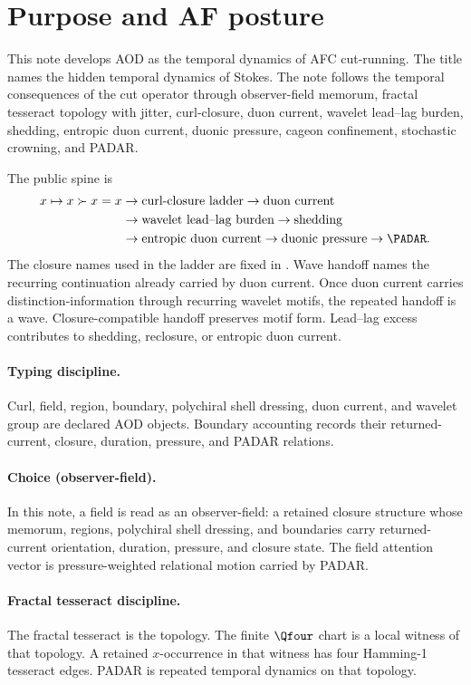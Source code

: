 
\section{Purpose and AF posture}\label{sec:purpose-af-posture}

This note develops AOD as the temporal dynamics of AFC cut-running. The title names the hidden temporal dynamics of Stokes. The note follows the temporal consequences of the cut operator through observer-field memorum, fractal tesseract topology with jitter, curl-closure, duon current, wavelet lead--lag burden, shedding, entropic duon current, duonic pressure, cageon confinement, stochastic crowning, and PADAR.

The public spine is
\[
\begin{aligned}
 x\mapsto x\succ x=x
&\to \text{curl-closure ladder}
\to \text{duon current} \\
&\to \text{wavelet lead--lag burden}
\to \text{shedding} \\
&\to \text{entropic duon current}
\to \text{duonic pressure}
\to \PADAR.
\end{aligned}
\]
The closure names used in the ladder are fixed in . Wave handoff names the recurring continuation already carried by duon current. Once duon current carries distinction-information through recurring wavelet motifs, the repeated handoff is a wave. Closure-compatible handoff preserves motif form. Lead--lag excess contributes to shedding, reclosure, or entropic duon current.

\paragraph{Typing discipline.}
Curl, field, region, boundary, polychiral shell dressing, duon current, and wavelet group are declared AOD objects. Boundary accounting records their returned-current, closure, duration, pressure, and PADAR relations.

\paragraph{Choice (observer-field).}
In this note, a field is read as an observer-field: a retained closure structure whose memorum, regions, polychiral shell dressing, and boundaries carry returned-current orientation, duration, pressure, and closure state. The field attention vector is pressure-weighted relational motion carried by PADAR.

\paragraph{Fractal tesseract discipline.}
The fractal tesseract is the topology. The finite \(\Qfour\) chart is a local witness of that topology. A retained \(x\)-occurrence in that witness has four Hamming-1 tesseract edges. PADAR is repeated temporal dynamics on that topology.

